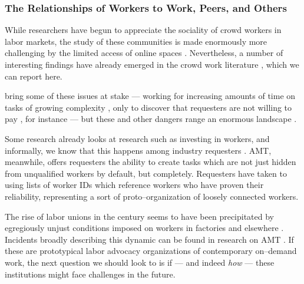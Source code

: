 \documentclass[trackingWork]{subfiles}
\begin{document}
\subsubsection[the relationships of workers]{The Relationships of Workers to Work, Peers, and Others}
\label{sec:relationships}

\subsubsubsection{\crowdworkpers}
While researchers have begun to appreciate
the sociality of crowd workers in labor markets,
the study of these communities is made enormously more challenging by
the limited access of online spaces 
\cite{crowdcollab}.
Nevertheless, a number of interesting findings have
already emerged in the crowd work literature%
, which we can report here.




\citeauthor{professionalcrowdworkEthics} bring some of these issues at stake
--- working for increasing amounts of time on tasks of growing complexity%
, only to discover that requesters are not willing to pay%
, for instance ---
but these and other dangers range an enormous landscape
\cite{crowdworkFuture,professionalcrowdworkEthics,nickerson2013crowd,dynamo}.


Some research already looks at research such as investing in workers, and
informally, we know that this happens among industry requesters
\cite{jonBrelig,shepherdingDow}.
AMT, meanwhile, offers requesters the ability to create tasks which are
not just hidden from unqualified workers by default, but completely.
Requesters have taken to using lists of worker IDs which reference
workers who have proven their reliability,
representing a sort of proto--organization of loosely connected workers.


\subsubsubsection{\pieceworkpers}
The rise of labor unions in the  century seems to have been precipitated by
egregiously unjust conditions imposed on workers in factories and elsewhere
\cite{ebbinghaus1999institutions}.
Incidents broadly describing this dynamic can be found in research on AMT
\cite{turkopticon,dynamo}.
If these are prototypical labor advocacy organizations of contemporary on--demand work,
the next question we should look to is if
--- and indeed \textit{how} ---
these institutions might face challenges in the future.
\end{document}
